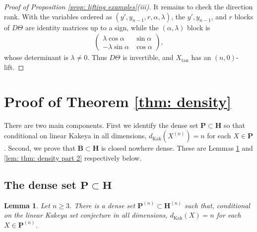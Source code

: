 \documentclass[reqno,11pt]{amsart}
\numberwithin{equation}{section}
\numberwithin{figure}{section}
\renewcommand\geq{\geqslant}
\theoremstyle{plain}
\newtheorem{lemma}[thm]{Lemma}
\theoremstyle{definition}
\newcommand{\Kak}{\mathrm{Kak}}
\begin{document}
\begin{proof}[Proof of Proposition \ref{prop: lifting examples}(iii)]
        It remains to check the direction rank. With the variables ordered as $(y',y_{n-1}, r,\alpha,\lambda)$, the $y', y_{n-1}$, and $r$ blocks of $D\Theta$ are identity matrices up to a sign, while the $(\alpha,\lambda)$ block is 
        \begin{align}
            \begin{pmatrix}
            \lambda \cos \alpha & \sin \alpha \\
            -\lambda \sin \alpha & \cos \alpha
            \end{pmatrix},
        \end{align}
        whose determinant is $\lambda \neq 0$. Thus $D\Theta$ is invertible, and $X_{\tan}$ has an $(n,0)$-lift.
    \end{proof}

     \section{Proof of Theorem \ref{thm: density}}\label{sec: thm: density}

    There are two main components. First we identify the dense set $\mathbf P \subset \mathbf H$ so that conditional on linear Kakeya in all dimensions, $d_{\Kak}(X^{(n)}) = n$ for each $X \in \mathbf P$. Second, we prove that $\mathbf B \subset \mathbf H$ is closed nowhere dense. These are Lemmas \ref{lem: thm: density part 1} and \ref{lem: thm: density part 2} respectively below. 


    \subsection{The dense set $\mathbf P \subset \mathbf H$}

    \begin{lemma}\label{lem: thm: density part 1}
        Let $n \geq 3$. There is a dense set $\mathbf P^{(n)} \subset \mathbf H^{(n)}$ such that, conditional on the linear Kakeya set conjecture in all dimensions, $d_{\Kak}(X) = n$ for each $X \in \mathbf P^{(n)}$. 
    \end{lemma}
\end{document}
